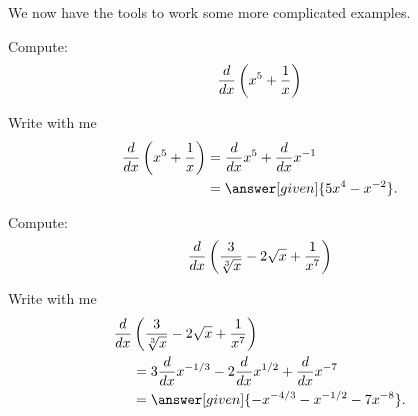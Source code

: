 \documentclass{ximera}
\begin{document}
We now have the tools to work some more complicated examples. 


\begin{example}
Compute:
\[
\frac{d}{\mathop{}\!d x} \left( x^5+\frac{1}{x}\right)
\] 
\begin{explanation}
Write with me
\begin{align*}
\ddx \left(x^5+\frac{1}{x}\right) &= \ddx x^5 + \ddx x^{-1} \\
&=\answer[given]{5x^4 - x^{-2}}.
\end{align*}
\end{explanation}
\end{example}

\begin{example}
Compute:
\[
\frac{d}{\mathop{}\!d x} \left(\frac{3}{\sqrt[3]{x}}-2\sqrt{x}+\frac{1}{x^7}\right)
\]
\begin{explanation}
Write with me
\begin{align*}
  \ddx &\left(\frac{3}{\sqrt[3]{x}}-2\sqrt{x}+\frac{1}{x^7}\right)\\
  &= 3\ddx x^{-1/3} -2\ddx x^{1/2}+\ddx x^{-7}\\
  &=\answer[given]{-x^{-4/3} - x^{-1/2}-7x^{-8}}.
\end{align*}
\end{explanation}
\end{example}
\end{document}
